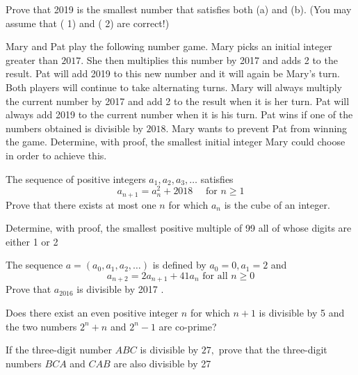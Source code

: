 \documentclass{pset}
\begin{document}
\begin{problems}
\begin{problem}[IrMO 2019 Q6]
    Prove that 2019 is the smallest number that satisfies both (a) and (b). (You may assume that ( 1) and ( 2) are correct!)
\end{problem}

\begin{problem}[IrMO 2018 Q1]
    Mary and Pat play the following number game. Mary picks an initial integer greater than \(2017 .\) She then multiplies this number by 2017 and adds 2 to the result. Pat will add 2019 to this new number and it will again be Mary's turn. Both players will continue to take alternating turns. Mary will always multiply the current number by 2017 and add 2 to the result when it is her turn. Pat will always add 2019 to the current number when it is his turn. Pat wins if one of the numbers obtained is divisible by \(2018 .\) Mary wants to prevent Pat from winning the game. Determine, with proof, the smallest initial integer Mary could choose in order to achieve this.
\end{problem}

\begin{problem}[IrMO 2018 Q9]
    The sequence of positive integers \(a_{1}, a_{2}, a_{3}, \ldots\) satisfies
    $$
    a_{n+1}=a_{n}^{2}+2018 \quad \text { for } n \geq 1
    $$
    Prove that there exists at most one \(n\) for which \(a_{n}\) is the cube of an integer.
\end{problem}

\begin{problem}[IrMO 2017 Q1]
    Determine, with proof, the smallest positive multiple of 99 all of whose digits are either 1 or 2
\end{problem}

\begin{problem}[IrMO 2017 Q5]
    The sequence \(a=\left(a_{0}, a_{1}, a_{2}, \ldots\right)\) is defined by \(a_{0}=0, a_{1}=2\) and
    $$
    a_{n+2}=2 a_{n+1}+41 a_{n} \text { for all } n \geq 0
    $$
    Prove that \(a_{2016}\) is divisible by 2017 .
\end{problem}

\begin{problem}[IrMO 2017 Q6]
    Does there exist an even positive integer \(n\) for which \(n+1\) is divisible by 5 and the two numbers \(2^{n}+n\) and \(2^{n}-1\) are co-prime?
\end{problem}

\begin{problem}[IrMO 2016 Q1]
    If the three-digit number \(A B C\) is divisible by \(27,\) prove that the three-digit numbers \(B C A\) and \(C A B\) are also divisible by 27
\end{problem}


\end{problems}
\end{document}
